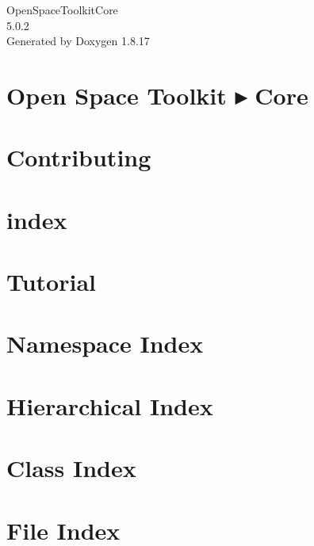 \let\mypdfximage\pdfximage\def\pdfximage{\immediate\mypdfximage}\documentclass[twoside]{book}
\newcommand{\+}{\discretionary{\mbox{\scriptsize$\hookleftarrow$}}{}{}}
\newcommand{\clearemptydoublepage}{%
  \newpage{\pagestyle{empty}\cleardoublepage}%
}
\begin{document}
\hypersetup{pageanchor=false,
             bookmarksnumbered=true,
             pdfencoding=unicode
            }
\begin{titlepage}
\vspace*{7cm}
\begin{center}%
{\Large Open\+Space\+Toolkit\+Core \\[1ex]\large 5.\+0.\+2 }\\
\vspace*{1cm}
{\large Generated by Doxygen 1.8.17}\\
\end{center}
\end{titlepage}
\clearemptydoublepage
{}
\tableofcontents
\clearemptydoublepage
{}
\hypersetup{pageanchor=true}

\chapter{Open Space Toolkit ▸ Core}
\label{index}\hypertarget{index}{}
\chapter{Contributing}
\label{md__c_o_n_t_r_i_b_u_t_i_n_g}

\chapter{index}
\label{md_docs_index}

\chapter{Tutorial}
\label{md_docs__tutorial}

\chapter{Namespace Index}

\chapter{Hierarchical Index}

\chapter{Class Index}

\chapter{File Index}

\end{document}
